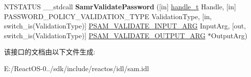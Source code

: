 \begin{DoxyCompactItemize}
\mbox{\label{interfacesamr_ac041235b930d2ddc5ab8911d181665e3}} 
N\+T\+S\+T\+A\+T\+US \+\_\+\+\_\+stdcall {\bfseries Samr\+Validate\+Password} (\mbox{[}in\mbox{]} \hyperlink{interfacevoid}{handle\+\_\+t} Handle, \mbox{[}in\mbox{]} P\+A\+S\+S\+W\+O\+R\+D\+\_\+\+P\+O\+L\+I\+C\+Y\+\_\+\+V\+A\+L\+I\+D\+A\+T\+I\+O\+N\+\_\+\+T\+Y\+PE Validation\+Type, \mbox{[}in, switch\+\_\+is(Validation\+Type)\mbox{]} \hyperlink{union___s_a_m___v_a_l_i_d_a_t_e___i_n_p_u_t___a_r_g}{P\+S\+A\+M\+\_\+\+V\+A\+L\+I\+D\+A\+T\+E\+\_\+\+I\+N\+P\+U\+T\+\_\+\+A\+RG} Input\+Arg, \mbox{[}out, switch\+\_\+is(Validation\+Type)\mbox{]} \hyperlink{union___s_a_m___v_a_l_i_d_a_t_e___o_u_t_p_u_t___a_r_g}{P\+S\+A\+M\+\_\+\+V\+A\+L\+I\+D\+A\+T\+E\+\_\+\+O\+U\+T\+P\+U\+T\+\_\+\+A\+RG} $\ast$Output\+Arg)
\end{DoxyCompactItemize}


该接口的文档由以下文件生成\+:\begin{DoxyCompactItemize}
\item 
E\+:/\+React\+O\+S-\/0../sdk/include/reactos/idl/sam.\+idl\end{DoxyCompactItemize}

